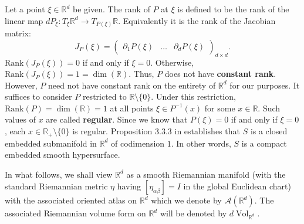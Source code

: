 \documentclass{article}
\newcommand{\p}{\partial}
\newcommand{\R}{\mathbb{R}}
\theoremstyle{theorem}
\newtheorem{theorem}{Theorem}[section]
\newcommand{\Vol}{\operatorname{Vol}}
\begin{document}
Let a point $\xi\in \R^d$ be given. The rank of $P$ at $\xi$ is defined to be the rank of the linear map $d P_\xi: T_\xi \R^d \to T_{P(\xi)} \R $. Equivalently it is the rank of the Jacobian matrix:
\begin{equation*}
    J_P(\xi) = \begin{pmatrix}
    \p_1 P(\xi) & \dots & \p_{d} P(\xi)
    \end{pmatrix}_{ d \times d}.
\end{equation*}
$\text{Rank}(J_P(\xi)) = 0$ if and only if $\xi = 0$. Otherwise, $\text{Rank}(J_P(\xi)) = 1 = \dim(\R)$. Thus, $P$ does not have \textbf{constant rank}. However, $P$ need not have constant rank on the entirety of $\R^d$ for our purposes. It suffices to consider $P$ restricted to $\R\setminus \{0 \}$.  
Under this restriction, $\text{Rank}(P) = \dim(\R) = 1$ at all points $\xi \in P^{-1}(x)$ for some $x\in \R$. Such values of $x$ are called \textbf{regular}. Since we know that $P(\xi) = 0$ if and only if $\xi = 0$, each $x\in \R_+\setminus\{ 0 \}$ is regular. Proposition 3.3.3 in \cite{absil2009optimization} establishes that $S$ is a closed embedded submanifold in $\R^d$ of codimension $1$. In other words, $S$ is a compact embedded smooth hypersurface.


In what follows, we shall view $\mathbb{R}^d$ as a smooth Riemannian manifold (with the standard Riemannian metric $\eta$ having $[\eta_{\alpha\beta}]=I$ in the global Euclidean chart) with the associated oriented atlas on $\mathbb{R}^d$ which we denote by $\mathcal{A}(\mathbb{R}^d)$. The associated Riemannian volume form on $\mathbb{R}^d$ will be denoted by $d\Vol_{\mathbb{R}^d}$. 
\end{document}
